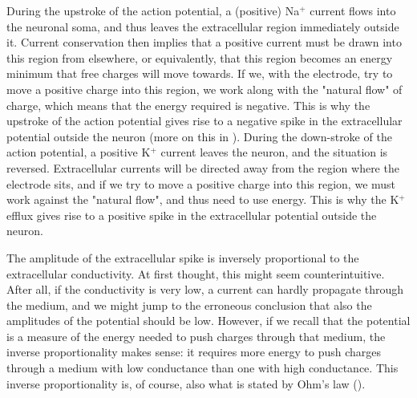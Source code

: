 During the upstroke of the action potential, a (positive) Na$^+$ current flows into the neuronal soma, and thus leaves the extracellular region immediately outside it. Current conservation then implies that a positive current must be drawn into this region from elsewhere, or equivalently, that this region becomes an energy minimum that free charges will move towards. If we, with the electrode, try to move a positive charge into this region, we work along with the "natural flow" of charge, which means that the energy required is negative. This is why the upstroke of the action potential gives rise to a negative spike in the extracellular potential outside the neuron (more on this in ). During the down-stroke of the action potential, a positive K$^+$ current leaves the neuron, and the situation is reversed. Extracellular currents will be directed away from the region where the electrode sits, and if we try to move a positive charge into this region, we must work against the "natural flow", and thus need to use energy. This is why the K$^+$ efflux gives rise to a positive spike in the extracellular potential outside the neuron.

The amplitude of the extracellular spike is inversely proportional to the extracellular conductivity. 
At first thought, this might seem counterintuitive. After all, if the conductivity is very low, a current can hardly propagate through the medium, and we might jump to the erroneous conclusion that also the amplitudes of the potential should be low. However, if we recall that the potential is a measure of the energy needed to push charges through that medium, the inverse proportionality makes sense: it requires more energy to push charges through a medium with low conductance than one with high conductance. This inverse proportionality is, of course, also what is stated by Ohm's law (). 

